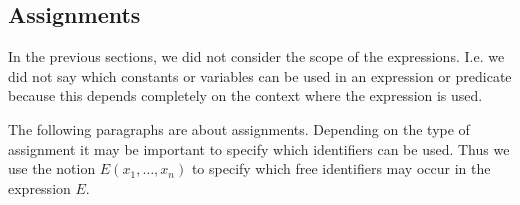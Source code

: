 \subsection{Assignments}
\label{assignments}

In the previous sections, we did not consider the scope of the expressions. I.e. we did
not say which constants or variables can be used in an expression or predicate because
this depends completely on the context where the expression is used.

The following paragraphs are about assignments. Depending on the type of assignment it
may be important to specify which identifiers can be used.
Thus we use the notion $E(x_1,\ldots,x_n)$ to specify which free identifiers may occur
in the expression $E$.

\newcommand{\eventbassignmentexpr}[1]{E_{#1}(\allconstants,\concvariables,\concparameters)}

